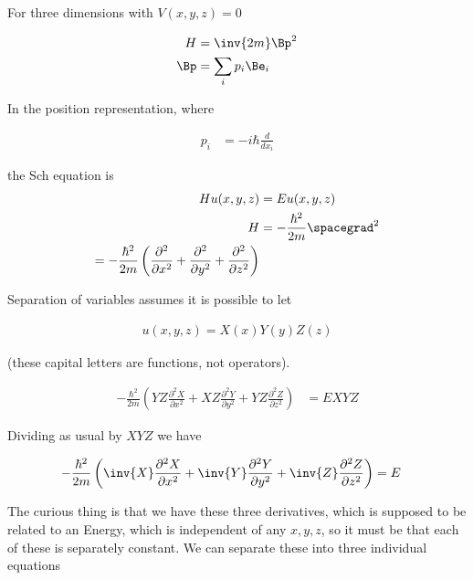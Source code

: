 %
%
For three dimensions with $V(x,y,z) = 0$

\begin{align*}
H &= \inv{2m} \Bp^2 \\
\Bp &= \sum_i p_i \Be_i \\
\end{align*}

In the position representation, where

\begin{align*}
p_i &= -i \hbar \frac{d}{dx_i}
\end{align*}

the Sch equation is
\begin{align*}
H u(x,y,z) &= E u(x,y,z) \\
H &= -\frac{\hbar^2}{2m} \spacegrad^2 \\
= -\frac{\hbar^2}{2m} \left(
\frac{\partial^2}{\partial {x}^2}
+\frac{\partial^2}{\partial {y}^2}
+\frac{\partial^2}{\partial {z}^2}
\right)
\end{align*}

Separation of variables assumes it is possible to let

\begin{align*}
u(x,y,z) = X(x) Y(y) Z(z)
\end{align*}

(these capital letters are functions, not operators).

\begin{align*}
-\frac{\hbar^2}{2m} \left(
YZ \frac{\partial^2 X}{\partial {x}^2}
+ XZ \frac{\partial^2 Y}{\partial {y}^2}
+ YZ \frac{\partial^2 Z}{\partial {z}^2}\right)
&= E X Y Z
\end{align*}

Dividing as usual by $XYZ$ we have

\begin{align*}
-\frac{\hbar^2}{2m} \left(
\inv{X} \frac{\partial^2 X}{\partial {x}^2}
+ \inv{Y} \frac{\partial^2 Y}{\partial {y}^2}
+ \inv{Z} \frac{\partial^2 Z}{\partial {z}^2} \right)
&= E
\end{align*}

The curious thing is that we have these three derivatives, which is supposed to be related to an Energy, which is independent of any $x,y,z$, so it must be that each of these is separately constant.  We can separate these into three individual equations

